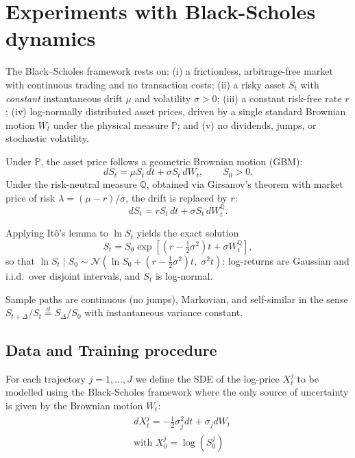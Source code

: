\chapter{Experiments with Black-Scholes dynamics}
\label{sec:bs_experiments}

The Black--Scholes framework rests on: (i) a frictionless, arbitrage-free market with continuous trading and no transaction costs; (ii) a risky asset $S_t$ with \emph{constant} instantaneous drift $\mu$ and volatility $\sigma>0$; (iii) a constant risk-free rate $r$; (iv) log-normally distributed asset prices, driven by a single standard Brownian motion $W_t$ under the physical measure $\mathbb{P}$; and (v) no dividends, jumps, or stochastic volatility.

Under $\mathbb{P}$, the asset price follows a geometric Brownian motion (GBM):
\begin{equation}
dS_t = \mu S_t\, dt + \sigma S_t\, dW_t, \qquad S_0 > 0.
\end{equation}
Under the risk-neutral measure $\mathbb{Q}$, obtained via Girsanov's theorem with market price of risk $\lambda = (\mu-r)/\sigma$, the drift is replaced by $r$:
\begin{equation}
dS_t = r S_t\, dt + \sigma S_t\, dW_t^{\mathbb{Q}}.
\end{equation}


Applying It\^o's lemma to $\ln S_t$ yields the exact solution
\begin{equation}
S_t = S_0 \exp\left[\left(r - \tfrac{1}{2}\sigma^2\right)t + \sigma W_t^{\mathbb{Q}}\right],
\end{equation}
so that $\ln S_t \mid S_0 \sim \mathcal{N}\!\left(\ln S_0 + (r-\tfrac12\sigma^2)t,\; \sigma^2 t\right)$: log-returns are Gaussian and i.i.d.\ over disjoint intervals, and $S_t$ is log-normal.


Sample paths are continuous (no jumps), Markovian, and self-similar in the sense $S_{t+\Delta}/S_t \stackrel{d}{=} S_\Delta/S_0$ with instantaneous variance constant.


\section{Data and Training procedure}

For each trajectory $j = 1, ..., J$ we define 
the SDE of the log-price $X_t^j$ to be modelled using the Black-Scholes framework where the only source of uncertainty is given by the Brownian motion $W_t$:
\begin{equation}
    \label{log-price SDE}
    \begin{aligned}
       &dX_t^j = -\frac{1}{2}\sigma_j^2 dt + \sigma_j dW_t\\
         &\text{with } X_0^j = \log(S_0^j)
    \end{aligned}
    \end{equation} 

